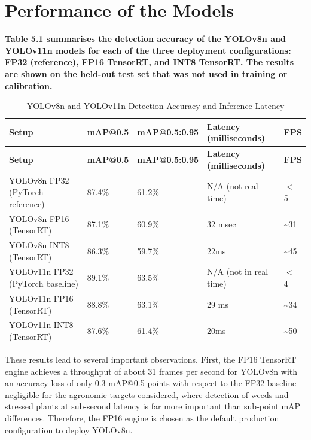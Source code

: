 \documentclass[12pt,a4paper]{report}
\renewcommand{\arraystretch}{1.25}
\begin{document}
\section{Performance of the Models}

\textbf{Table 5.1 summarises the detection accuracy of the YOLOv8n and YOLOv11n models for each of the three deployment configurations: FP32 (reference), FP16 TensorRT, and INT8 TensorRT. The results are shown on the held-out test set that was not used in training or calibration.}

\begingroup
\small
\setlength{\parskip}{0pt}
\setlength{\tabcolsep}{4pt}
\renewcommand{\arraystretch}{1.2}
\begin{longtable}{|P{0.25\textwidth}|P{0.14\textwidth}|P{0.17\textwidth}|P{0.17\textwidth}|P{0.10\textwidth}|}
\caption{YOLOv8n and YOLOv11n Detection Accuracy and Inference Latency}\\
\hline
\textbf{Setup} & \textbf{mAP@0.5} & \textbf{mAP@0.5:0.95} & \textbf{Latency (milliseconds)} & \textbf{FPS} \\ \hline
\endfirsthead
\hline
\textbf{Setup} & \textbf{mAP@0.5} & \textbf{mAP@0.5:0.95} & \textbf{Latency (milliseconds)} & \textbf{FPS} \\ \hline
\endhead
YOLOv8n FP32 (PyTorch reference) & 87.4\% & 61.2\% & N/A (not real time) & $<$ 5 \\ \hline
YOLOv8n FP16 (TensorRT) & 87.1\% & 60.9\% & 32 msec & \textasciitilde{}31 \\ \hline
YOLOv8n INT8 (TensorRT) & 86.3\% & 59.7\% & 22ms & \textasciitilde{}45 \\ \hline
YOLOv11n FP32 (PyTorch baseline) & 89.1\% & 63.5\% & N/A (not in real time) & $<$ 4 \\ \hline
YOLOv11n FP16 (TensorRT) & 88.8\% & 63.1\% & 29 ms & \textasciitilde{}34 \\ \hline
YOLOv11n INT8 (TensorRT) & 87.6\% & 61.4\% & 20ms & \textasciitilde{}50 \\ \hline
\end{longtable}
\endgroup

These results lead to several important observations. First, the FP16 TensorRT engine achieves a throughput of about 31 frames per second for YOLOv8n with an accuracy loss of only 0.3 mAP@0.5 points with respect to the FP32 baseline - negligible for the agronomic targets considered, where detection of weeds and stressed plants at sub-second latency is far more important than sub-point mAP differences. Therefore, the FP16 engine is chosen as the default production configuration to deploy YOLOv8n.
\end{document}
